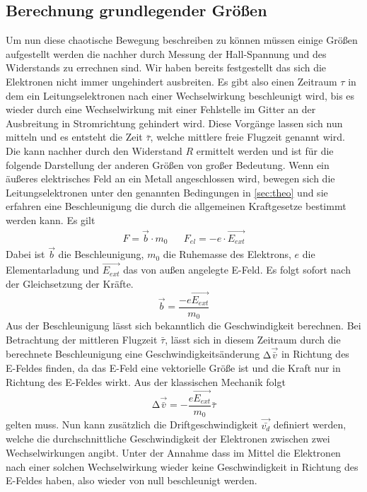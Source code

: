 \subsection{Berechnung grundlegender Größen}
Um nun diese chaotische Bewegung beschreiben zu können müssen einige Größen aufgestellt werden die nachher durch Messung der Hall-Spannung und des Widerstands zu errechnen sind.
Wir haben bereits festgestellt das sich die Elektronen nicht immer ungehindert ausbreiten. Es gibt also einen Zeitraum $\tau$ in dem ein Leitungselektronen nach einer Wechselwirkung
beschleunigt wird, bis es wieder durch eine Wechselwirkung mit einer Fehlstelle im Gitter an der Ausbreitung in Stromrichtung gehindert wird.
Diese Vorgänge lassen sich nun mitteln und es entsteht die Zeit $\bar{\tau}$, welche mittlere freie Flugzeit genannt wird.
Die kann nachher durch den Widerstand $R$ %
ermittelt werden und ist für die folgende Darstellung der anderen Größen von großer Bedeutung.
Wenn ein äußeres elektrisches Feld an ein Metall angeschlossen wird, bewegen sich die Leitungselektronen unter den genannten Bedingungen in \ref{sec:theo} und sie erfahren eine Beschleunigung
die durch die allgemeinen Kraftgesetze bestimmt werden kann. Es gilt
\begin{align}
\nonumber
F = \vec{b} \cdot m_{0} && F_{el} = -e \cdot \vec{E_{ext}}
\end{align}
Dabei ist $\vec{b}$ die Beschleunigung, $m_{0}$ die Ruhemasse des Elektrons, $e$ die Elementarladung und $\vec{E_{ext}}$ das von außen angelegte E-Feld.
Es folgt sofort nach der Gleichsetzung der Kräfte.
\begin{equation}
\vec{b} = \frac{-e \vec{E_{ext}}}{m_{0}}
\end{equation}
Aus der Beschleunigung lässt sich bekanntlich die Geschwindigkeit berechnen. Bei Betrachtung der mittleren Flugzeit $\bar{\tau}$, lässt sich in diesem Zeitraum durch die
berechnete Beschleunigung eine Geschwindigkeitsänderung $\increment \vec{\bar{v}}$ in Richtung des E-Feldes finden, da das E-Feld eine vektorielle Größe ist und die Kraft nur in Richtung des E-Feldes wirkt.
Aus der klassischen Mechanik folgt
\begin{equation}
\label{eqn:deltav}
\increment \vec{\bar{v}} = - \frac{e\vec{E_{ext}}}{m_{0}} \bar{\tau}
\end{equation}
gelten muss. Nun kann zusätzlich die Driftgeschwindigkeit $\vec{\bar{v_{d}}}$ definiert werden, welche die durchschnittliche Geschwindigkeit der Elektronen zwischen zwei Wechselwirkungen
angibt. Unter der Annahme dass im Mittel die Elektronen nach einer solchen Wechselwirkung wieder keine Geschwindigkeit in Richtung des E-Feldes haben, also wieder von null beschleunigt werden.
